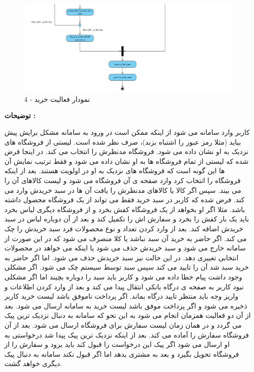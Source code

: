 \documentclass[12pt,a4paper]{article}
\begin{document}
		\begin{figure}[h!]
			\begin{center}
				\includegraphics[width=14cm]{images/Buy Activity Diagram 4.png}
			\end{center}
			\caption{نمودار فعالیت خرید - 4}
		\end{figure}
		\textbf{توضیحات :} 
	
	
	کاربر وارد سامانه می شود از اینکه ممکن است در ورود به سامانه مشکل برایش پیش بیاید (مثلا رمز عبور را اشتباه بزند)، صرف نظر شده است. لیستی از فروشگاه های نزدیک به او نشان داده می شود. فروشگاه مدنظرش را انتخاب می کند. در اینجا فرض شده که لیستی از تمام فروشگاه ها به او نشان داده می شود و فقط ترتیب نمایش آن ها این گونه است که فروشگاه های نزدیک به او در اولویت هستند. بعد از اینکه فروشگاه را انتخاب کرد وارد صفحه ی آن فروشگاه می شود و لیست کالاهای آن را می بیند. سپس اگر کالا یا کالاهای مدنظرش را یافت آن ها در سبد خریدش وارد می کند. فرض شده که کاربر در سبد خرید فقط می تواند از یک فروشگاه محصول داشته باشد. مثلا اگر او بخواهد از یک فروشگاه کفش بخرد و از فروشگاه دیگری لباس بخرد باید یک بار کفش را بخرد و سفارش اش را تکمیل کند و بعد از آن دوباره لباس در سبد خریدش اضافه کند. بعد از وارد کردن تعداد و نوع محصولات فرد سبد خریدش را چک می کند. اگر حاضر به خرید آن سبد نباشد یا کلا منصرف می شود که در این صورت از سامانه خارج می شود و سبد خریدش حذف می شود یا اینکه می خواهد در محصولات انتخابی تغییری دهد. در این حالت نیز سبد خریدش حذف می شود. اما اگر حاضر به خرید سبد شد آن را تایید می کند سپس سبد توسط سیستم چک می شود. اگر مشکلی وجود داشت پیام خطا داده می شود و کاربر باید سبد را دوباره بچیند اما اگر مشکلی نبود کاربر به صفحه ی درگاه بانکی انتقال پیدا می کند و بعد از وارد کردن اطلاعات و واریز وجه باید منتظر تایید درگاه بماند. اگر پرداخت ناموفق باشد لیست خرید کاربر ذخیره می شود و اگر پرداخت موفق باشد لیست خرید به سامانه ارسال می شود. بعد از آن دو فعالیت همزمان انجام می شود به این نحو که سامانه به دنبال نزدیک ترین پیک می گردد و در همان زمان لیست سفارش برای فروشگاه ارسال می شود. بعد از آن فروشگاه سفارش را آماده می کند. بعد از اینکه نزدیک ترین پیک پیدا شد درخواستی به او ارسال می شود اگر پیک این درخواست را قبول کند باید برود و سفارش را از فروشگاه تحویل بگیرد و بعد به مشتری بدهد اما اگر قبول نکند سامانه به دنبال پیک دیگری خواهد گشت.
	
\end{document}

